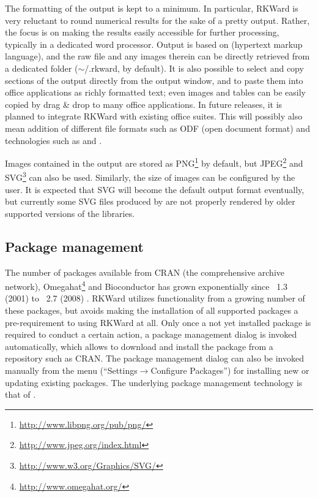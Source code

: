 The formatting of the output is kept to a minimum. In particular,
RKWard is very reluctant to round numerical results for the sake of a
pretty output. Rather, the focus is on making the results easily
accessible for further processing, typically in a dedicated word
processor. Output is based on
 (hypertext markup language), and the raw
 file and any images therein can be directly
retrieved from a dedicated folder
($\sim\!$/.rkward, by default). It is also
possible to select and copy sections of the output directly from the
output window, and to paste them into office applications as
richly formatted text; even images and tables can be easily copied by drag \& drop to many office applications. In future releases, 
it is planned to integrate RKWard
with existing office suites. This
will possibly also mean addition of different file formats such as ODF (open
document format) and technologies such as  and 
\citep{Leisch2002, Kuhn2006}.

Images contained in the output are stored as
PNG\footnote{\url{http://www.libpng.org/pub/png/}} by
default, but JPEG\footnote{\url{http://www.jpeg.org/index.html}} and
SVG\footnote{\url{http://www.w3.org/Graphics/SVG/}}
can also be used. Similarly, the size of 
images can be configured by the user. It is expected that SVG will
become the default output format eventually, but currently some SVG
files produced by  are not properly
rendered by older supported versions of the
 libraries.

\subsection{Package management}
\label{sec:package_management}
The number of  packages available from CRAN (the comprehensive  archive
network), Omegahat\footnote{\url{http://www.omegahat.org/}} and Bioconductor \citep{Gentleman2004} has grown exponentially since \, 1.3
(2001) to \, 2.7 (2008) \citep{Fox2008, Ligges2003, Visne2009}. RKWard
utilizes functionality from a growing number of these packages, but avoids
making the installation of all supported packages a pre-requirement to using
RKWard at all. Only once a not yet installed package is required to conduct a certain
action, a package management dialog is invoked automatically, which allows to
download and install the package from a repository such as CRAN. The package
management dialog can also be invoked manually from the menu
(``Settings$\rightarrow$Configure Packages'') for installing new or updating existing 
packages. The underlying package management technology is that of 
\citep{Ligges2003, Ripley2005}.

